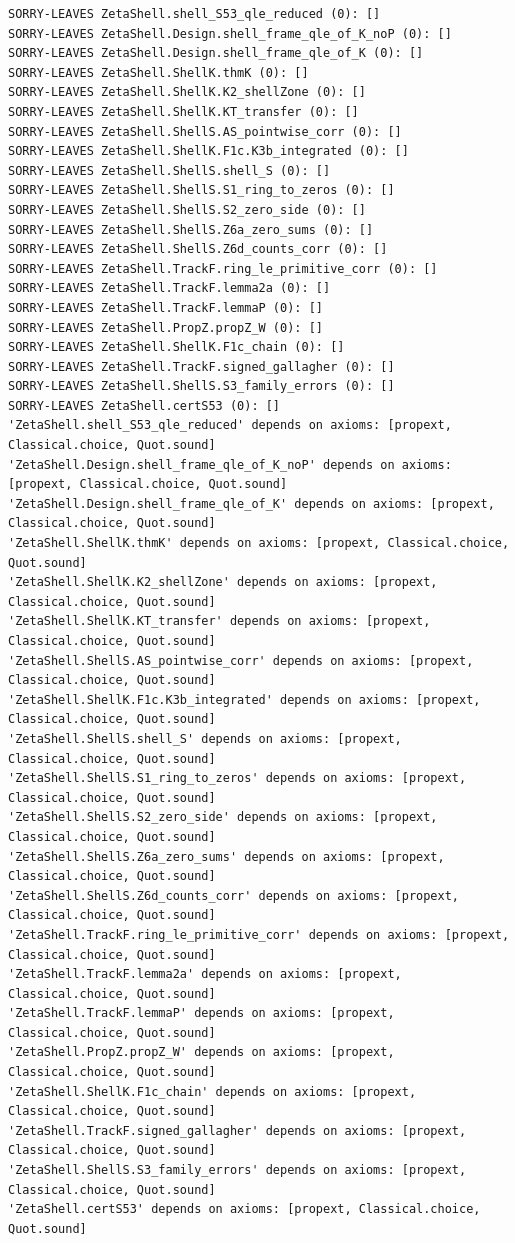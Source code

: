 \begin{Verbatim}[fontsize=\footnotesize,breaklines,frame=single,framesep=2mm]
SORRY-LEAVES ZetaShell.shell_S53_qle_reduced (0): []
SORRY-LEAVES ZetaShell.Design.shell_frame_qle_of_K_noP (0): []
SORRY-LEAVES ZetaShell.Design.shell_frame_qle_of_K (0): []
SORRY-LEAVES ZetaShell.ShellK.thmK (0): []
SORRY-LEAVES ZetaShell.ShellK.K2_shellZone (0): []
SORRY-LEAVES ZetaShell.ShellK.KT_transfer (0): []
SORRY-LEAVES ZetaShell.ShellS.AS_pointwise_corr (0): []
SORRY-LEAVES ZetaShell.ShellK.F1c.K3b_integrated (0): []
SORRY-LEAVES ZetaShell.ShellS.shell_S (0): []
SORRY-LEAVES ZetaShell.ShellS.S1_ring_to_zeros (0): []
SORRY-LEAVES ZetaShell.ShellS.S2_zero_side (0): []
SORRY-LEAVES ZetaShell.ShellS.Z6a_zero_sums (0): []
SORRY-LEAVES ZetaShell.ShellS.Z6d_counts_corr (0): []
SORRY-LEAVES ZetaShell.TrackF.ring_le_primitive_corr (0): []
SORRY-LEAVES ZetaShell.TrackF.lemma2a (0): []
SORRY-LEAVES ZetaShell.TrackF.lemmaP (0): []
SORRY-LEAVES ZetaShell.PropZ.propZ_W (0): []
SORRY-LEAVES ZetaShell.ShellK.F1c_chain (0): []
SORRY-LEAVES ZetaShell.TrackF.signed_gallagher (0): []
SORRY-LEAVES ZetaShell.ShellS.S3_family_errors (0): []
SORRY-LEAVES ZetaShell.certS53 (0): []
'ZetaShell.shell_S53_qle_reduced' depends on axioms: [propext, Classical.choice, Quot.sound]
'ZetaShell.Design.shell_frame_qle_of_K_noP' depends on axioms: [propext, Classical.choice, Quot.sound]
'ZetaShell.Design.shell_frame_qle_of_K' depends on axioms: [propext, Classical.choice, Quot.sound]
'ZetaShell.ShellK.thmK' depends on axioms: [propext, Classical.choice, Quot.sound]
'ZetaShell.ShellK.K2_shellZone' depends on axioms: [propext, Classical.choice, Quot.sound]
'ZetaShell.ShellK.KT_transfer' depends on axioms: [propext, Classical.choice, Quot.sound]
'ZetaShell.ShellS.AS_pointwise_corr' depends on axioms: [propext, Classical.choice, Quot.sound]
'ZetaShell.ShellK.F1c.K3b_integrated' depends on axioms: [propext, Classical.choice, Quot.sound]
'ZetaShell.ShellS.shell_S' depends on axioms: [propext, Classical.choice, Quot.sound]
'ZetaShell.ShellS.S1_ring_to_zeros' depends on axioms: [propext, Classical.choice, Quot.sound]
'ZetaShell.ShellS.S2_zero_side' depends on axioms: [propext, Classical.choice, Quot.sound]
'ZetaShell.ShellS.Z6a_zero_sums' depends on axioms: [propext, Classical.choice, Quot.sound]
'ZetaShell.ShellS.Z6d_counts_corr' depends on axioms: [propext, Classical.choice, Quot.sound]
'ZetaShell.TrackF.ring_le_primitive_corr' depends on axioms: [propext, Classical.choice, Quot.sound]
'ZetaShell.TrackF.lemma2a' depends on axioms: [propext, Classical.choice, Quot.sound]
'ZetaShell.TrackF.lemmaP' depends on axioms: [propext, Classical.choice, Quot.sound]
'ZetaShell.PropZ.propZ_W' depends on axioms: [propext, Classical.choice, Quot.sound]
'ZetaShell.ShellK.F1c_chain' depends on axioms: [propext, Classical.choice, Quot.sound]
'ZetaShell.TrackF.signed_gallagher' depends on axioms: [propext, Classical.choice, Quot.sound]
'ZetaShell.ShellS.S3_family_errors' depends on axioms: [propext, Classical.choice, Quot.sound]
'ZetaShell.certS53' depends on axioms: [propext, Classical.choice, Quot.sound]
\end{Verbatim}
